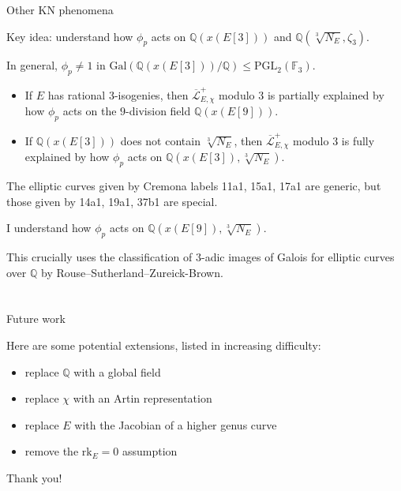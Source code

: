 \documentclass[10pt]{beamer}
\begin{document}
\begin{frame}[t]{Other KN phenomena}

Key idea: understand how $ \phi_p $ acts on $ \mathbb{Q}(x(E[3])) $ and $ \mathbb{Q}(\sqrt[3]{N_E}, \zeta_3) $.

\pause

\vspace{0.5cm} In general, $ \phi_p \ne 1 $ in $ \mathrm{Gal}(\mathbb{Q}(x(E[3])) / \mathbb{Q}) \le \mathrm{PGL}_2(\mathbb{F}_3) $.

\pause

\begin{itemize}
\item If $ E $ has rational $ 3 $-isogenies, then $ \overline{\mathcal{L}}_{E, \chi}^+ $ modulo $ 3 $ is partially explained by how $ \phi_p $ acts on the $ 9 $-division field $ \mathbb{Q}(x(E[9])) $.

\pause

\item If $ \mathbb{Q}(x(E[3])) $ does not contain $ \sqrt[3]{N_E} $, then $ \overline{\mathcal{L}}_{E, \chi}^+ $ modulo $ 3 $ is fully explained by how $ \phi_p $ acts on $ \mathbb{Q}(x(E[3]), \sqrt[3]{N_E}) $.
\end{itemize}

\pause

The elliptic curves given by Cremona labels 11a1, 15a1, 17a1 are generic, but those given by 14a1, 19a1, 37b1 are special.

\pause

\vspace{0.5cm}

\begin{theorem}[A.]
I understand how $ \phi_p $ acts on $ \mathbb{Q}(x(E[9]), \sqrt[3]{N_E}) $.
\end{theorem}

\pause

This crucially uses the classification of $ 3 $-adic images of Galois for elliptic curves over $ \mathbb{Q} $ by Rouse--Sutherland--Zureick-Brown.

\end{frame}

\section{}

\begin{frame}{Future work}

Here are some potential extensions, listed in increasing difficulty:
\begin{itemize}
\item replace $ \mathbb{Q} $ with a global field
\item replace $ \chi $ with an Artin representation
\item replace $ E $ with the Jacobian of a higher genus curve
\item remove the $ \mathrm{rk}_E = 0 $ assumption
\end{itemize}
Thank you!

\end{frame}
\end{document}
